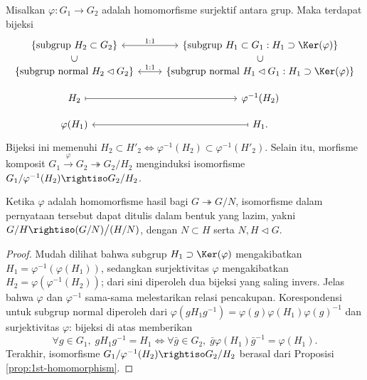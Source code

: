\begin{proposition}\label{prop:2nd-homomorphism}
	Misalkan $\varphi: G_1 \to G_2$ adalah homomorfisme surjektif antara grup. Maka terdapat bijeksi
	\[ \begin{tikzcd}[row sep=small]
		\left\{ \text{subgrup }  H_2 \subset G_2  \right\} \arrow[leftrightarrow, r, "1:1"] & \left\{ \text{subgrup } H_1 \subset G_1 : H_1 \supset \Ker(\varphi)  \right\} \\
		\left\{ \text{subgrup normal }  H_2 \lhd G_2  \right\} \arrow[phantom, u, "\subset" description, sloped] \arrow[leftrightarrow, r, "1:1"] & \left\{ \text{subgrup normal } H_1 \lhd G_1 : H_1 \supset \Ker(\varphi)  \right\} \arrow[phantom, u, "\subset" description, sloped] \\
		H_2 \arrow[mapsto, r] & \varphi^{-1}(H_2) \\
		\varphi(H_1) & H_1 \arrow[mapsto, l] .
	\end{tikzcd} \]
	Bijeksi ini memenuhi $H_2 \subset H'_2 \iff \varphi^{-1}(H_2) \subset \varphi^{-1}(H'_2)$. Selain itu, morfisme komposit $G_1 \xrightarrow{\varphi} G_2 \twoheadrightarrow G_2/H_2$ menginduksi isomorfisme $G_1/\varphi^{-1}(H_2) \rightiso G_2/H_2$.
\end{proposition}
Ketika $\varphi$ adalah homomorfisme hasil bagi $G \twoheadrightarrow G/N$, isomorfisme dalam pernyataan tersebut dapat ditulis dalam bentuk yang lazim, yakni $G/H \rightiso (G/N) \big/ (H/N)$, dengan $N \subset H$ serta $N, H \lhd G$.
\begin{proof}
	Mudah dilihat bahwa subgrup $H_1 \supset \Ker(\varphi)$ mengakibatkan $H_1 = \varphi^{-1}(\varphi(H_1))$, sedangkan surjektivitas $\varphi$ mengakibatkan $H_2 = \varphi(\varphi^{-1}(H_2))$; dari sini diperoleh dua bijeksi yang saling invers. Jelas bahwa $\varphi$ dan $\varphi^{-1}$ sama-sama melestarikan relasi pencakupan. Korespondensi untuk subgrup normal diperoleh dari $\varphi(g H_1 g^{-1}) = \varphi(g) \varphi(H_1) \varphi(g)^{-1}$ dan surjektivitas $\varphi$: bijeksi di atas memberikan
	\[ \forall g \in G_1, \; g H_1 g^{-1} = H_1 \iff \forall \bar{g} \in G_2, \; \bar{g} \varphi(H_1) \bar{g}^{-1} = \varphi(H_1). \]
	Terakhir, isomorfisme $G_1/\varphi^{-1}(H_2) \rightiso G_2/H_2$ berasal dari Proposisi \ref{prop:1st-homomorphism}.
\end{proof}

